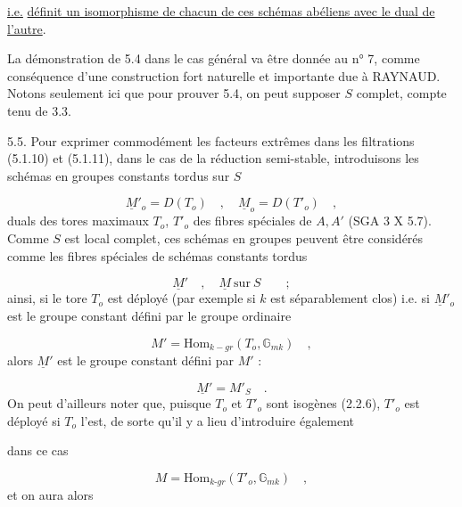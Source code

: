 
\underline{i.e.} \underline{définit un isomorphisme de chacun de ces schémas abéliens avec le dual de l'autre}.

La démonstration de 5.4 dans le cas général va être donnée au n° 7, comme conséquence d'une construction fort naturelle et importante due à RAYNAUD. Notons seulement ici que pour prouver 5.4, on peut supposer $S$ complet, compte tenu de 3.3.

5.5. Pour exprimer commodément les facteurs extrêmes dans les filtrations (5.1.10) et (5.1.11), dans le cas de la réduction semi-stable, introduisons les schémas en groupes constants tordus sur $S$

\begin{equation}\tag{5.5.1}
\underline{M}'_o = D(T_o) \quad , \quad \underline{M}_o = D(T'_o) \quad ,
\end{equation}
duals des tores maximaux $T_o$, $T'_o$ des fibres spéciales de $A,A'$ (SGA 3 X 5.7). Comme $S$ est local complet, ces schémas en groupes peuvent être considérés comme les fibres spéciales de schémas constants tordus

\begin{equation}\tag{5.5.2}
\underline{M}' \quad , \quad \underline{M} \ \text{sur} \ S \qquad ;
\end{equation}
ainsi, si le tore $T_o$ est déployé (par exemple si $k$ est séparablement clos) i.e. si $\underline{M}'_o$ est le groupe constant défini par le groupe ordinaire

\begin{equation}\tag{5.5.3}
M' = \mathrm{Hom}_{k-gr}(T_o,\mathbb{G}_{mk}) \quad ,
\end{equation}
alors $\underline{M}'$ est le groupe constant défini par $M'$ :

\begin{equation*}
\underline{M}' = M'_S \quad .
\end{equation*}
On peut d'ailleurs noter que, puisque $T_o$ et $T'_o$ sont isogènes (2.2.6), $T'_o$ est déployé si $T_o$ l'est, de sorte qu'il y a lieu d'introduire également



dans ce cas

\begin{equation}\tag{5.5.4}
M = \mathrm{Hom}_{k\text{-}gr}(T'_o, \mathbb{G}_{mk}) \quad ,
\end{equation}
et on aura alors

